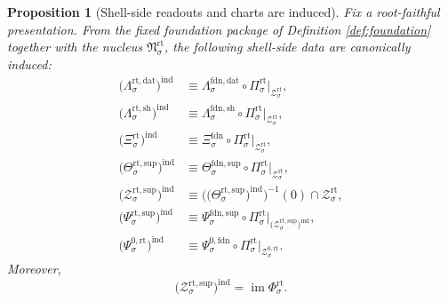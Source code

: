\documentclass[11pt]{article}
\newcommand{\FoundData}[1]{\Lambda_{#1}^{\mathrm{fdn,dat}}}
\newcommand{\FoundShellMap}[1]{\Lambda_{#1}^{\mathrm{fdn,sh}}}
\newcommand{\FoundChart}[1]{\Xi_{#1}^{\mathrm{fdn}}}
\newcommand{\FoundSupport}[1]{\Theta_{#1}^{\mathrm{fdn,sup}}}
\newcommand{\FoundEqChart}[1]{\Psi_{#1}^{\mathrm{fdn,sup}}}
\newcommand{\FoundZeroChart}[1]{\Psi_{#1}^{0,\mathrm{fdn}}}
\newcommand{\RootProj}[1]{\Pi_{#1}^{\mathrm{rt}}}
\newcommand{\RootData}[1]{\Lambda_{#1}^{\mathrm{rt,dat}}}
\newcommand{\RootShellMap}[1]{\Lambda_{#1}^{\mathrm{rt,sh}}}
\newcommand{\RootShellSet}[1]{\mathcal Z_{#1}^{\mathrm{rt}}}
\newcommand{\RootChart}[1]{\Xi_{#1}^{\mathrm{rt}}}
\newcommand{\RootSupport}[1]{\Theta_{#1}^{\mathrm{rt,sup}}}
\newcommand{\RootSupportShell}[1]{\mathcal Z_{#1}^{\mathrm{rt,sup}}}
\newcommand{\RootZeroCore}[1]{\mathcal Z_{#1}^{0,\mathrm{rt}}}
\newcommand{\RootEqChart}[1]{\Psi_{#1}^{\mathrm{rt,sup}}}
\newcommand{\RootZeroChart}[1]{\Psi_{#1}^{0,\mathrm{rt}}}
\newcommand{\RootSplit}[1]{\Phi_{#1}^{\mathrm{rt}}}
\newcommand{\RootNucleus}[1]{\mathfrak N_{#1}^{\mathrm{rt}}}
\newtheorem{proposition}{Proposition}
\begin{document}
\begin{proposition}[Shell-side readouts and charts are induced]
\label{prop:induced-shell}
Fix a root-faithful presentation. From the fixed foundation package of Definition \ref{def:foundation} together with the nucleus \(\RootNucleus{\sigma}\), the following shell-side data are canonically induced:
\begin{align}
\bigl(\RootData{\sigma}\bigr)^{\mathrm{ind}}
&\equiv
\FoundData{\sigma}\circ\RootProj{\sigma}\big|_{\RootShellSet{\sigma}},
\label{eq:ind-data}
\\
\bigl(\RootShellMap{\sigma}\bigr)^{\mathrm{ind}}
&\equiv
\FoundShellMap{\sigma}\circ\RootProj{\sigma}\big|_{\RootShellSet{\sigma}},
\label{eq:ind-shell}
\\
\bigl(\RootChart{\sigma}\bigr)^{\mathrm{ind}}
&\equiv
\FoundChart{\sigma}\circ\RootProj{\sigma}\big|_{\RootShellSet{\sigma}},
\label{eq:ind-chart}
\\
\bigl(\RootSupport{\sigma}\bigr)^{\mathrm{ind}}
&\equiv
\FoundSupport{\sigma}\circ\RootProj{\sigma}\big|_{\RootShellSet{\sigma}},
\label{eq:ind-support}
\\
\bigl(\RootSupportShell{\sigma}\bigr)^{\mathrm{ind}}
&\equiv
\bigl(\bigl(\RootSupport{\sigma}\bigr)^{\mathrm{ind}}\bigr)^{-1}(0)\cap\RootShellSet{\sigma},
\label{eq:ind-support-shell}
\\
\bigl(\RootEqChart{\sigma}\bigr)^{\mathrm{ind}}
&\equiv
\FoundEqChart{\sigma}\circ\RootProj{\sigma}\big|_{\bigl(\RootSupportShell{\sigma}\bigr)^{\mathrm{ind}}},
\label{eq:ind-eq}
\\
\bigl(\RootZeroChart{\sigma}\bigr)^{\mathrm{ind}}
&\equiv
\FoundZeroChart{\sigma}\circ\RootProj{\sigma}\big|_{\RootZeroCore{\sigma}}.
\label{eq:ind-zero}
\end{align}
Moreover,
\begin{equation}
\bigl(\RootSupportShell{\sigma}\bigr)^{\mathrm{ind}}
=
\operatorname{im}\RootSplit{\sigma}.
\label{eq:ind-image}
\end{equation}
\end{proposition}
\end{document}
